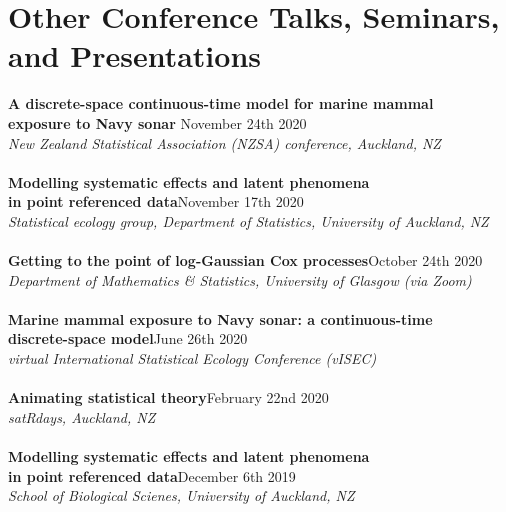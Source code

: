 \documentclass[10pt,letter]{article}
\begin{document}
\section*{Other Conference Talks, Seminars, and Presentations}
\vspace{1mm}
       {\textbf{A discrete-space continuous-time model for marine mammal \\
           exposure to Navy sonar }}\hfill November 24th 2020\\
       {\sl New Zealand Statistical Association (NZSA) conference, Auckland, NZ}\\
       \hdashrule[0.5ex]{4cm}{1pt}{1pt}\\
       {\textbf{Modelling systematic effects and latent phenomena \\
              in point referenced data}}\hfill November 17th 2020\\
       {\sl Statistical ecology group, Department of Statistics, University of Auckland, NZ}\\
       \hdashrule[0.5ex]{4cm}{1pt}{1pt}\\
        {\textbf{Getting to the point of log-Gaussian Cox processes}}\hfill October 24th 2020\\
       {\sl Department of Mathematics \& Statistics, University of Glasgow (via Zoom)}\\
\hdashrule[0.5ex]{4cm}{1pt}{1pt}\\
       {\textbf{Marine mammal exposure to Navy sonar: a continuous-time \\
           discrete-space model}}\hfill June 26th 2020\\
       {\sl virtual International Statistical Ecology Conference (vISEC)}\\
\hdashrule[0.5ex]{4cm}{1pt}{1pt}\\
{\textbf{Animating statistical theory}}\hfill February 22nd 2020\\
 {\sl satRdays, Auckland, NZ}\\
\hdashrule[0.5ex]{4cm}{1pt}{1pt}\\
          {\textbf{Modelling systematic effects and latent phenomena \\
              in point referenced data}}\hfill December 6th 2019\\
 {\sl School of Biological Scienes, University of Auckland, NZ}\\
\hdashrule[0.5ex]{4cm}{1pt}{1pt}\\
\end{document}
